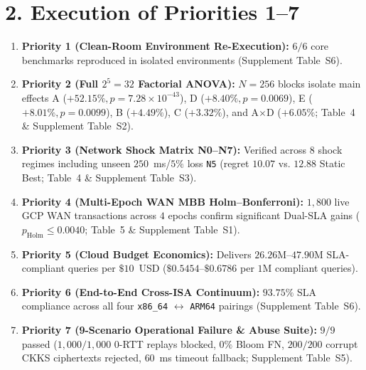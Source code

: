 \documentclass[11pt,a4paper]{article}
\begin{document}
\section*{2. Execution of Priorities 1--7}
\begin{enumerate}
    \item \textbf{Priority 1 (Clean-Room Environment Re-Execution):} $6/6$ core benchmarks reproduced in isolated environments (Supplement Table~S6).
    \item \textbf{Priority 2 (Full $2^5=32$ Factorial ANOVA):} $N=256$ blocks isolate main effects A ($+52.15\%, p=7.28\times 10^{-43}$), D ($+8.40\%, p=0.0069$), E ($+8.01\%, p=0.0099$), B ($+4.49\%$), C ($+3.32\%$), and A$\times$D ($+6.05\%$; Table~4 \& Supplement Table~S2).
    \item \textbf{Priority 3 (Network Shock Matrix N0--N7):} Verified across 8 shock regimes including unseen $250$~ms/$5\%$ loss \texttt{N5} (regret $10.07$ vs. $12.88$ Static Best; Table~4 \& Supplement Table~S3).
    \item \textbf{Priority 4 (Multi-Epoch WAN MBB Holm--Bonferroni):} $1,800$ live GCP WAN transactions across $4$ epochs confirm significant Dual-SLA gains ($p_{\mathrm{Holm}} \le 0.0040$; Table~5 \& Supplement Table~S1).
    \item \textbf{Priority 5 (Cloud Budget Economics):} Delivers $26.26\text{M}$--$47.90\text{M}$ SLA-compliant queries per $\$10$~USD ($\$0.5454$--$\$0.6786$ per $1\text{M}$ compliant queries).
    \item \textbf{Priority 6 (End-to-End Cross-ISA Continuum):} $93.75\%$ SLA compliance across all four \texttt{x86\_64} $\leftrightarrow$ \texttt{ARM64} pairings (Supplement Table~S6).
    \item \textbf{Priority 7 (9-Scenario Operational Failure \& Abuse Suite):} $9/9$ passed ($1,000/1,000$ 0-RTT replays blocked, $0\%$ Bloom FN, $200/200$ corrupt CKKS ciphertexts rejected, $60$~ms timeout fallback; Supplement Table~S5).
\end{enumerate}
\end{document}
